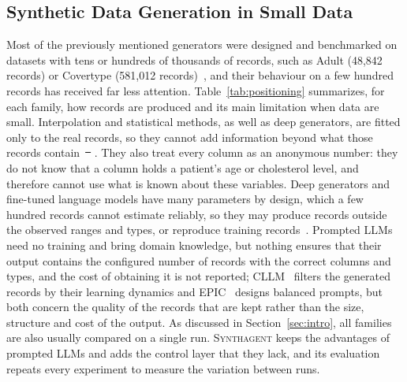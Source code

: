 \documentclass[conference]{IEEEtran}
\newcommand{\system}{\textsc{Synthagent}\xspace}
\providecommand{\DIFaddtex}[1]{{\protect\color{blue}\uwave{#1}}} %
\providecommand{\DIFdeltex}[1]{{\protect\color{red}\sout{#1}}}                      %
\providecommand{\DIFaddbegin}{} %
\providecommand{\DIFaddend}{} %
\providecommand{\DIFdelbegin}{} %
\providecommand{\DIFdelend}{} %
\providecommand{\DIFadd}[1]{\texorpdfstring{\DIFaddtex{#1}}{#1}} %
\providecommand{\DIFdel}[1]{\texorpdfstring{\DIFdeltex{#1}}{}} %
\newcommand{\DIFscaledelfig}{0.5}
\newlength{\DIFdelgraphicswidth} %
\newlength{\DIFdelgraphicsheight} %
\newcommand{\DIFaddincludegraphics}[2][]{{\color{blue}\fbox{\DIFOincludegraphics[#1]{#2}}}} %
\newcommand{\DIFdelincludegraphics}[2][]{%
\sbox{\DIFdelgraphicsbox}{\DIFOincludegraphics[#1]{#2}}%
\settoboxwidth{\DIFdelgraphicswidth}{\DIFdelgraphicsbox} %
\settoboxtotalheight{\DIFdelgraphicsheight}{\DIFdelgraphicsbox} %
\scalebox{\DIFscaledelfig}{%
\parbox[b]{\DIFdelgraphicswidth}{\usebox{\DIFdelgraphicsbox}\\[-\baselineskip] \rule{\DIFdelgraphicswidth}{0em}}\llap{\resizebox{\DIFdelgraphicswidth}{\DIFdelgraphicsheight}{%
\setlength{\unitlength}{\DIFdelgraphicswidth}%
\begin{picture}(1,1)%
\thicklines\linethickness{2pt} %
{\color[rgb]{1,0,0}\put(0,0){\framebox(1,1){}}}%
{\color[rgb]{1,0,0}\put(0,0){\line( 1,1){1}}}%
{\color[rgb]{1,0,0}\put(0,1){\line(1,-1){1}}}%
\end{picture}%
}\hspace*{3pt}}} %
} %
\DeclareRobustCommand{\DIFaddbegin}{\DIFOaddbegin \let\includegraphics\DIFaddincludegraphics} %
\DeclareRobustCommand{\DIFaddend}{\DIFOaddend \let\includegraphics\DIFOincludegraphics} %
\DeclareRobustCommand{\DIFdelbegin}{\DIFOdelbegin \let\includegraphics\DIFdelincludegraphics} %
\DeclareRobustCommand{\DIFdelend}{\DIFOaddend \let\includegraphics\DIFOincludegraphics} %
\begin{document}
\subsection{Synthetic Data Generation in Small Data}
Most of the previously mentioned generators were designed and benchmarked on datasets with tens or hundreds of thousands of records, such as Adult (48,842 records) or Covertype (581,012 records)~\cite{xu2019ctgan}, and their behaviour on a few hundred records has received far less attention. Table~\ref{tab:positioning} summarizes, for each family, how records are produced and its main limitation when data are small. Interpolation and statistical methods, as well as deep generators, are fitted only to the real records, so they cannot add information beyond what those records contain~\DIFdelbegin \DIFdel{\mbox{%
\cite{cover2006elements}}\hskip0pt%
}\DIFdelend \DIFaddbegin \DIFadd{\mbox{%
\cite[Sec.~2.8]{cover2006elements}}\hskip0pt%
}\DIFaddend . They also treat every column as an anonymous number: they do not know that a column holds a patient's age or cholesterol level, and therefore cannot use what is known about these variables. Deep generators and fine-tuned language models have many parameters by design, which a few hundred records cannot estimate reliably, so they may produce records outside the observed ranges and types, or reproduce training records~\cite{hyeong2022tabularmia}. Prompted LLMs need no training and bring domain knowledge, but nothing ensures that their output contains the configured number of records with the correct columns and types, and the cost of obtaining it is not reported; CLLM~\cite{seedat2024cllm} filters the generated records by their learning dynamics and EPIC~\cite{kim2024epic} designs balanced prompts, but both concern the quality of the records that are kept rather than the size, structure and cost of the output. As discussed in Section~\ref{sec:intro}, all families are also usually compared on a single run. \system keeps the advantages of prompted LLMs and adds the control layer that they lack, and its evaluation repeats every experiment to measure the variation between runs.
\end{document}
